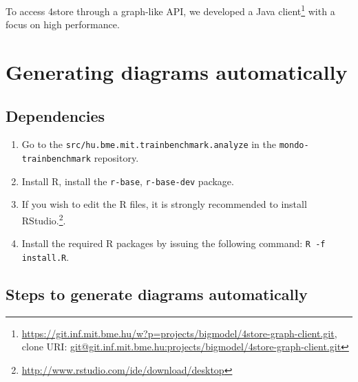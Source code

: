 To access 4store through a graph-like API, we developed a Java client\footnote{\url{https://git.inf.mit.bme.hu/w?p=projects/bigmodel/4store-graph-client.git}, \\ clone URI: \url{git@git.inf.mit.bme.hu:projects/bigmodel/4store-graph-client.git}} with a focus on high performance.


\section{Generating diagrams automatically}

\subsection{Dependencies}

\begin{enumerate}
  \item Go to the \texttt{src/hu.bme.mit.trainbenchmark.analyze} in the \texttt{mondo-trainbenchmark} repository.
  \item Install R, install the \texttt{r-base}, \texttt{r-base-dev} package.
  \item If you wish to edit the R files, it is strongly recommended to install RStudio.\footnote{\url{http://www.rstudio.com/ide/download/desktop}}.
  \item Install the required R packages by issuing the following command: \texttt{R -f install.R}. 
\end{enumerate}

\subsection{Steps to generate diagrams automatically}

